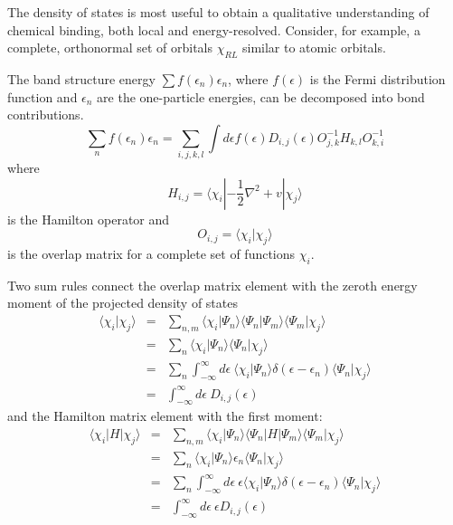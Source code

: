 \documentclass[final,12pt]{article}
\begin{document}
{{{{The density of states is most useful to obtain a qualitative
understanding of chemical binding, both local and energy-resolved.
Consider, for example, a complete, orthonormal set of orbitals
$\chi_{RL}$ similar to atomic orbitals.

The band structure energy $\sum f(\epsilon_n)\epsilon_n$, where
$f(\epsilon)$ is the Fermi distribution function and $\epsilon_n$ are
the one-particle energies, can be decomposed into bond
contributions. 
\begin{equation}
\sum_n f(\epsilon_n)\epsilon_n 
= \sum_{i,j,k,l} \int d\epsilon f(\epsilon)
D_{i,j}(\epsilon) O^{-1}_{j,k} H_{k,l}O^{-1}_{k,i}
\end{equation}
where 
\begin{equation}
H_{i,j}=\langle\chi_i|-\frac{1}{2}\nabla^2+v|\chi_j\rangle
\end{equation}
is the Hamilton operator and 
\begin{equation}
O_{i,j}=\langle\chi_i|\chi_j\rangle
\end{equation}
is the overlap matrix for a complete set of functions $\chi_i$.

Two sum rules connect the overlap matrix element
with the zeroth energy moment of the projected density of states
\begin{eqnarray*}
\langle\chi_i|\chi_j\rangle&=&\sum_{n,m}
\langle\chi_i|\Psi_n\rangle\langle\Psi_n|\Psi_m\rangle\langle\Psi_m|\chi_j\rangle
\\
&=&\sum_{n}\langle\chi_i|\Psi_n\rangle   \langle\Psi_n|\chi_j\rangle
\\
&=&\sum_{n}\int_{-\infty}^{\infty} d\epsilon\ 
\langle\chi_i|\Psi_n\rangle\delta(\epsilon-\epsilon_n)
\langle\Psi_n|\chi_j\rangle
\\
&=&\int_{-\infty}^{\infty} d\epsilon\  D_{i,j}(\epsilon)
\end{eqnarray*}
and the Hamilton matrix element with the first moment:
\begin{eqnarray*}
\langle\chi_i|H|\chi_j\rangle&=&\sum_{n,m}
\langle\chi_i|\Psi_n\rangle\langle\Psi_n|H|\Psi_m\rangle\langle\Psi_m|\chi_j\rangle
\\
&=&\sum_{n}\langle\chi_i|\Psi_n\rangle  \epsilon_n \langle\Psi_n|\chi_j\rangle
\\
&=&\sum_{n}\int_{-\infty}^{\infty} d\epsilon\ \epsilon
\langle\chi_i|\Psi_n\rangle\delta(\epsilon-\epsilon_n)
\langle\Psi_n|\chi_j\rangle
\\
&=&\int_{-\infty}^{\infty} d\epsilon\ \epsilon D_{i,j}(\epsilon)
\end{eqnarray*}

}}}}
\end{document}
